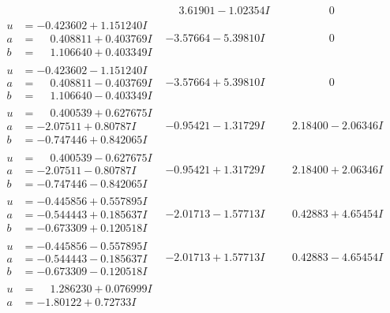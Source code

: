 \documentclass[1p]{elsarticle_modified}
\theoremstyle{definition}
\begin{document}
$$\begin{array}{c|c|c}
 & \phantom{-}3.61901 - 1.02354 I & \phantom{-0.000000 } 0 \\ \hline\begin{aligned}
u &= -0.423602 + 1.151240 I \\
a &= \phantom{-}0.408811 + 0.403769 I \\
b &= \phantom{-}1.106640 + 0.403349 I\end{aligned}
 & -3.57664 - 5.39810 I & \phantom{-0.000000 } 0 \\ \hline\begin{aligned}
u &= -0.423602 - 1.151240 I \\
a &= \phantom{-}0.408811 - 0.403769 I \\
b &= \phantom{-}1.106640 - 0.403349 I\end{aligned}
 & -3.57664 + 5.39810 I & \phantom{-0.000000 } 0 \\ \hline\begin{aligned}
u &= \phantom{-}0.400539 + 0.627675 I \\
a &= -2.07511 + 0.80787 I \\
b &= -0.747446 + 0.842065 I\end{aligned}
 & -0.95421 - 1.31729 I & \phantom{-}2.18400 - 2.06346 I \\ \hline\begin{aligned}
u &= \phantom{-}0.400539 - 0.627675 I \\
a &= -2.07511 - 0.80787 I \\
b &= -0.747446 - 0.842065 I\end{aligned}
 & -0.95421 + 1.31729 I & \phantom{-}2.18400 + 2.06346 I \\ \hline\begin{aligned}
u &= -0.445856 + 0.557895 I \\
a &= -0.544443 + 0.185637 I \\
b &= -0.673309 + 0.120518 I\end{aligned}
 & -2.01713 - 1.57713 I & \phantom{-}0.42883 + 4.65454 I \\ \hline\begin{aligned}
u &= -0.445856 - 0.557895 I \\
a &= -0.544443 - 0.185637 I \\
b &= -0.673309 - 0.120518 I\end{aligned}
 & -2.01713 + 1.57713 I & \phantom{-}0.42883 - 4.65454 I \\ \hline\begin{aligned}
u &= \phantom{-}1.286230 + 0.076999 I \\
a &= -1.80122 + 0.72733 I \\

\end{aligned}
\end{array}$$
\end{document}

